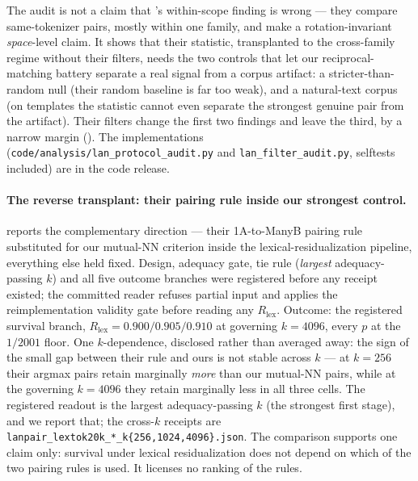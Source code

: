 The audit is not a claim that \citet{lan2024universal}'s within-scope finding is wrong ---
they compare same-tokenizer pairs, mostly within one family, and make a rotation-invariant
\emph{space}-level claim. It shows that their statistic, transplanted to the cross-family
regime without their filters, needs the two controls that let our reciprocal-matching battery
separate a real signal from a corpus artifact: a stricter-than-random null (their random
baseline is far too weak), and a natural-text corpus (on templates the statistic cannot even
separate the strongest genuine pair from the artifact). Their filters change the first two
findings and leave the third, by a narrow margin (). The implementations
(\texttt{code/analysis/lan\_protocol\_audit.py} and \texttt{lan\_filter\_audit.py}, selftests
included) are in the code release.

\paragraph{The reverse transplant: their pairing rule inside our strongest control.}
 reports the complementary direction --- their 1A-to-ManyB pairing rule
substituted for our mutual-NN criterion inside the  lexical-residualization
pipeline, everything else held fixed. Design, adequacy gate, tie rule (\emph{largest}
adequacy-passing $k$) and all five outcome branches were registered before any receipt
existed; the committed reader refuses partial input and applies the reimplementation
validity gate before reading any $R_{\text{lex}}$. Outcome: the registered survival branch,
$R_{\text{lex}}=0.900/0.905/0.910$ at governing $k{=}4096$, every $p$ at the $1/2001$ floor.
One $k$-dependence, disclosed rather than averaged away: the sign of the small gap between
their rule and ours is not stable across $k$ --- at $k{=}256$ their argmax pairs retain
marginally \emph{more} than our mutual-NN pairs, while at the governing $k{=}4096$ they
retain marginally less in all three cells. The registered readout is the largest
adequacy-passing $k$ (the strongest first stage), and we report that; the cross-$k$ receipts are
\texttt{lanpair\_lextok20k\_*\_k\{256,1024,4096\}.json}. The comparison
supports one claim only: survival under lexical residualization does not depend on which of
the two pairing rules is used. It licenses no ranking of the rules.



